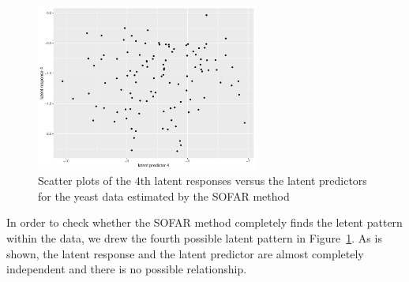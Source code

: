 \begin{figure}[ht]
    \centering
    \includegraphics[width=0.65\textwidth]{./figs/latent4.pdf}
    \caption{Scatter plots of the $4$th latent responses versus the latent predictors for the yeast data estimated by the SOFAR method}
    \label{fig:4th-pattern}
\end{figure}

In order to check whether the SOFAR method completely finds the letent pattern within the data, we drew the fourth possible latent pattern in Figure~\ref{fig:4th-pattern}. 
As is shown, the latent response and the latent predictor are almost completely independent and there is no possible relationship.